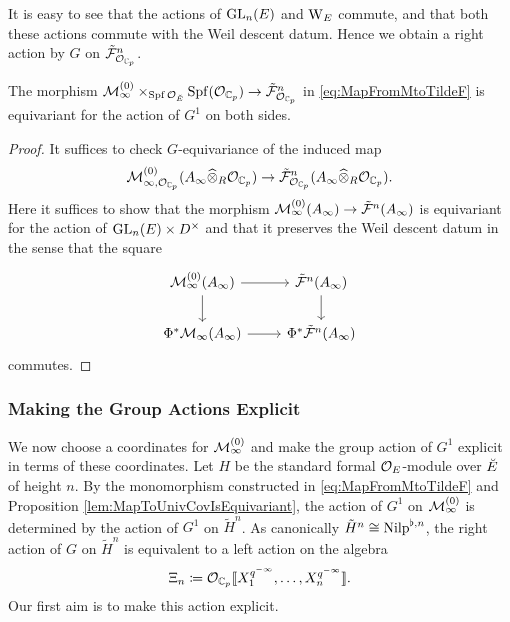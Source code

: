 \documentclass[../main.tex]{subfiles}
\begin{document}
It is easy to see that the actions of $\operatorname{GL}_n(E)$ and $\mathrm W_E$ commute,
and that both these actions commute with the Weil descent datum. Hence we
obtain a right action by $G$ on $\tilde {\mathcal{F}}^n_{\mathcal{O}_{\mathbb{C}_p}}$.

\begin{prop}\label{lem:MapToUnivCovIsEquivariant}
  The morphism $\mathcal{M}_{\infty}^{(0)} \times_{\operatorname{Spf} \mathcal{O}_{\breve {E}}} \operatorname{Spf}(\mathcal{O}_{\mathbb{C}_p})
  \to \tilde {\mathcal{F}}_{\mathcal{O}_{\mathbb{C}_p}}^n$
  in \eqref{eq:MapFromMtoTildeF} is equivariant for the action of $G^1$ on both
  sides.
\begin{proof}
  It suffices to check $G$-equivariance of the induced map
  $$\mathcal{M}_{\infty, \mathcal{O}_{\mathbb{C}_p}}^{(0)}(A_\infty \widehat \otimes_{R} \mathcal{O}_{\mathbb{C}_p}) \to \tilde
  {\mathcal{F}}^n_{\mathcal{O}_{\mathbb{C}_p}}(A_\infty \widehat \otimes_R \mathcal{O}_{\mathbb{C}_p}).$$
  Here it suffices to show that the morphism $\mathcal{M}_{\infty}^{(0)}(A_\infty) \to
  \tilde {\mathcal{F}}^n(A_\infty)$ is equivariant for the action of 
  $\operatorname{GL}_n(E) \times D^\times$ and that it preserves the Weil descent datum in 
  the sense that the square
  \begin{equation*}
    \begin{tikzcd}[ampersand replacement=\&]
    	{\cM_\infty^{(0)}(A_\infty)} \& {\tilde \cF^n(A_\infty)} \\
    	{\Phi^*\cM_\infty(A_\infty)} \& {\Phi^*\tilde \cF^n(A_\infty)}
    	\arrow[from=1-1, to=1-2]
    	\arrow[from=1-1, to=2-1]
    	\arrow[from=1-2, to=2-2]
    	\arrow[from=2-1, to=2-2]
    \end{tikzcd}
  \end{equation*}
  commutes. 
\end{proof}
\end{prop}


\subsubsection{Making the Group Actions Explicit} %
\label{ssub:Making the Group Actions Explicit}

We now choose a coordinates for $\mathcal{M}_{\infty}^{(0)}$ and make the group action
of $G^1$ explicit in terms of these coordinates. Let $H$ be the standard formal
$\mathcal{O}_E$-module over ${\breve {E}}$ of height $n$. By the monomorphism constructed in
\eqref{eq:MapFromMtoTildeF} and Proposition \ref{lem:MapToUnivCovIsEquivariant},
the action of $G^1$ on $\mathcal{M}_{\infty}^{(0)}$ is determined by the action of 
$G^1$ on $\tilde H^n$. As canonically $\tilde H^n \cong {\mathrm{Nilp}}^{\flat, n}$, the
right action
of $G$ on $\tilde H^n$ is equivalent to a left action on the algebra
$$\Xi_n \coloneqq \mathcal{O}_{\mathbb{C}_p} \llbracket X_1^{q^{-\infty}}, \dots, X_n^{q^{-\infty}}\rrbracket.$$ 
Our first aim is to make this action explicit.
\end{document}
